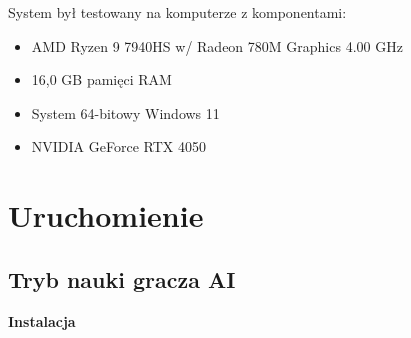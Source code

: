 \documentclass[a4paper,twoside,12pt]{book}
\begin{document}
		System był testowany na komputerze z komponentami:
		\begin{itemize}
			\item AMD Ryzen 9 7940HS w/ Radeon 780M Graphics 4.00 GHz
			\item 16,0 GB pamięci RAM
			\item System 64-bitowy Windows 11 
			\item NVIDIA GeForce RTX 4050
		\end{itemize}
	\section{Uruchomienie} 

	\subsection{Tryb nauki gracza AI} \label{ch:aktywacja}
	\textbf{Instalacja}
	
\end{document}
